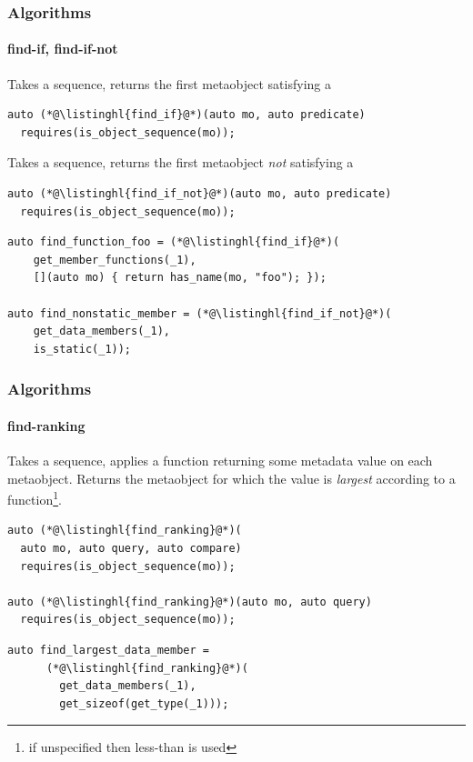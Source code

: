 \documentclass[compress,table,xcolor=table]{beamer}
\begin{document}
\begin{frame}[fragile]
  \frametitle{Algorithms}
  \framesubtitle{find-if, find-if-not}
  Takes a sequence, returns the first metaobject satisfying
  a 
  \begin{lstlisting}[language=c++2x]
auto (*@\listinghl{find_if}@*)(auto mo, auto predicate)
  requires(is_object_sequence(mo));
  \end{lstlisting}
  \vfill
  Takes a sequence, returns the first metaobject {\em not} satisfying
  a 
  \begin{lstlisting}[language=c++2x]
auto (*@\listinghl{find_if_not}@*)(auto mo, auto predicate)
  requires(is_object_sequence(mo));
  \end{lstlisting}
  \vfill
  \begin{lstlisting}[language=c++2x,basicstyle=\footnotesize\ttfamily]
auto find_function_foo = (*@\listinghl{find_if}@*)(
    get_member_functions(_1),
    [](auto mo) { return has_name(mo, "foo"); });

auto find_nonstatic_member = (*@\listinghl{find_if_not}@*)(
    get_data_members(_1),
    is_static(_1));
  \end{lstlisting}
\end{frame}
\begin{frame}[fragile]
  \frametitle{Algorithms}
  \framesubtitle{find-ranking}
  Takes a sequence, applies a  function returning some metadata
  value on each metaobject.
  Returns the metaobject for which the value is {\em largest} according
  to a  function\footnote{if unspecified then less-than is used}.
  \begin{lstlisting}[language=c++2x]
auto (*@\listinghl{find_ranking}@*)(
  auto mo, auto query, auto compare)
  requires(is_object_sequence(mo));

auto (*@\listinghl{find_ranking}@*)(auto mo, auto query)
  requires(is_object_sequence(mo));
  \end{lstlisting}
  \vfill
  \begin{lstlisting}[language=c++2x,basicstyle=\footnotesize\ttfamily]
    auto find_largest_data_member =
      (*@\listinghl{find_ranking}@*)(
        get_data_members(_1),
        get_sizeof(get_type(_1)));
  \end{lstlisting}
\end{frame}
\end{document}

